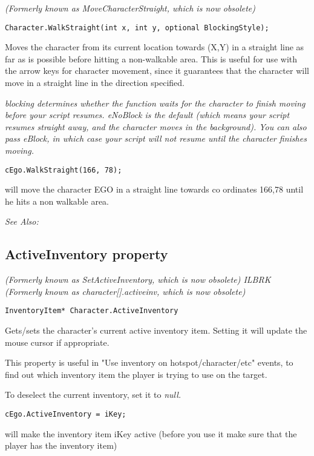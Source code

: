 \it{(Formerly known as MoveCharacterStraight, which is now obsolete)}

\begin{verbatim}
Character.WalkStraight(int x, int y, optional BlockingStyle);
\end{verbatim}
Moves the character from its current location towards (X,Y) in a straight
line as far as is possible before hitting a non-walkable area. This is
useful for use with the arrow keys for character movement, since it
guarantees that the character will move in a straight line in the direction
specified.

\it{blocking} determines whether the function waits for the character to finish moving
before your script resumes. eNoBlock is the default (which means your script
resumes straight away, and the character moves in the background). You can also pass
eBlock, in which case your script will not resume until the character finishes moving.

\begin{verbatim}
cEgo.WalkStraight(166, 78);
\end{verbatim}
will move the character EGO in a straight line towards co ordinates 166,78 until he
hits a non walkable area.

\it{See Also:} 


\subsection{ActiveInventory property}\label{Character.ActiveInventory}%

\it{(Formerly known as SetActiveInventory, which is now obsolete)} ILBRK
\it{(Formerly known as character[].activeinv, which is now obsolete)}

\begin{verbatim}
InventoryItem* Character.ActiveInventory
\end{verbatim}
Gets/sets the character's current active inventory item.
Setting it will update the mouse cursor if appropriate.

This property is useful in "Use inventory on hotspot/character/etc" events, to
find out which inventory item the player is trying to use on the target.

To deselect the current inventory, set it to \it{null}.

\begin{verbatim}
cEgo.ActiveInventory = iKey;
\end{verbatim}
will make the inventory item iKey active (before you use it make sure that the player
has the inventory item)


